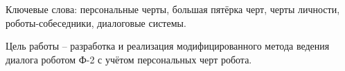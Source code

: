 \begin{essay}{}
	
	Ключевые слова: персональные черты, большая пятёрка черт, черты личности, роботы-собеседники, диалоговые системы.
	
	Цель работы -- разработка и реализация модифицированного метода ведения диалога роботом Ф-2 с учётом персональных черт робота.
\end{essay}